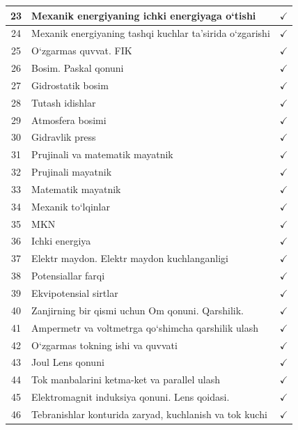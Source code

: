 \begin{table}[h]
\begin{tabular}{|c|p{13cm}|c|}
        23 & Mexanik energiyaning ichki energiyaga o‘tishi   &$\checkmark$ \\ \hline
        24 &  Mexanik energiyaning tashqi kuchlar ta’sirida o`zgarishi  &$\checkmark$ \\ \hline
        25 &  O‘zgarmas quvvat. FIK  & $\checkmark$\\ \hline
        26 &  Bosim. Paskal qonuni  &$\checkmark$ \\ \hline
        27 & Gidrostatik bosim   &$\checkmark$ \\ \hline
        28 &  Tutash idishlar  &$\checkmark$ \\ \hline
        29 & Atmosfera bosimi   & $\checkmark$\\ \hline
        30 &  Gidravlik press  &$\checkmark$ \\ \hline
        31 &  Prujinali va matematik mayatnik  &$\checkmark$ \\ \hline
        32 &  Prujinali mayatnik  &$\checkmark$ \\ \hline
        33 & Matematik mayatnik   &$\checkmark$ \\ \hline
        34 &  Mexanik to‘lqinlar  & $\checkmark$\\ \hline
        35 &   MKN & $\checkmark$\\ \hline
        36 &  Ichki energiya  & $\checkmark$ \\ \hline
        37 &  Elektr maydon. Elektr maydon kuchlanganligi  &$\checkmark$ \\ \hline
        38 &  Potensiallar farqi  &$\checkmark$ \\ \hline
        39 & Ekvipotensial sirtlar   &$\checkmark$ \\ \hline
        40 & Zanjirning bir qismi uchun Om qonuni. Qarshilik.   & $\checkmark$\\ \hline
        41 &  Ampermetr va voltmetrga qo`shimcha qarshilik ulash  &$\checkmark$ \\ \hline
        42 &  O`zgarmas tokning ishi va quvvati  & $\checkmark$\\ \hline
        43 & Joul Lens qonuni   &$\checkmark$ \\ \hline
        44 & Tok manbalarini ketma-ket va parallel ulash   &$\checkmark$ \\ \hline
        45 & Elektromagnit induksiya qonuni.  Lens qoidasi.   &$\checkmark$ \\ \hline
        46 & Tebranishlar konturida zaryad, kuchlanish va tok kuchi   &$\checkmark$ \\ \hline

\end{tabular}
\end{table}
